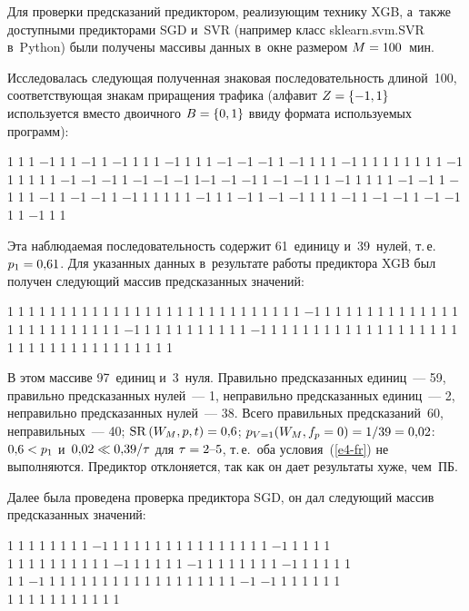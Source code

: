 \begin{multicols}{2}
  Для проверки предсказаний предиктором, реализующим технику XGB, 
а~также доступными предикторами SGD и~SVR 
(например класс sklearn.svm.SVR в~Python) были 
получены массивы данных в~окне размером $M\hm = 100$~мин.
   
  Исследовалась следующая полученная знаковая последовательность 
длиной~100, соответствующая знакам приращения трафика (алфавит $Z\hm = 
\{-1, 1\}$ используется вместо двоичного $B\hm = \{0, 1\}$ ввиду формата 
используемых программ):
  
   1 1 1 $-$1 1 1 $-$1 1 $-$1 1 1 1 $-$1 1 1 1 $-$1 $-$1 $-$1 1 $-$1 1 1 1 $-$1 1 1 1 1 1 1 1 1 $-
$1 1 1 1 1 1 $-$1 $-$1 $-$1 1 $-$1 $-$1 $-$1 1$-$1 $-$1 $-$1 1 $-$1 $-$1 1 1 $-$1 1 1 1 1 $-$1 
$-$1 1 $-$1 1 1 $-$1 1 $-$1 $-$1 1 $-$1 1 1 1 1 1 $-$1 1 1 $-$1 1 $-$1 $-$1 1 1 1 $-$1 1 $-$1 $-
$1 1 $-$1 $-$1 1 1 $-$1 1 1
  
  
\noindent
  Эта наблюдаемая последовательность содержит 61~единицу и~39~нулей, 
т.\,е.\ $p_1\hm = 0{,}61$. Для указанных данных в~результате работы 
предиктора XGB был получен следующий массив предсказанных значений:


  
   1 1 1 1 1 1 1 1 1 1 1 1 1 1 1 1 1 1 1 1 1 1 1 1 1 1 1 1 $-$1 
1 1 1 1 1 1 1 1 1 1 1 1 1 1 1 1 1 1 1 1 1 1 1 1 $-$1 1 1 1 1 1 1 1 1 1 1
$-$1 1 1 1 1 1 1 1 1 1 1 1 1 1 1 1 1 1 1 1 1 1 1 1 1 1 1 1 1 1 1 1 1 1 1

\vspace*{2pt}
 
 \noindent 
  В этом массиве 97~единиц и~3~нуля. Правильно предсказанных единиц~--- 
  59, правильно предсказанных нулей~--- 1, неправильно предсказанных 
единиц~--- 2, неправильно предсказанных нулей~--- 38. Всего правильных 
предсказаний~60, неправильных~--- 40; $\mathrm{SR}\,(W_M, p, t) \hm= 
0{,}6$; $p_{V=1}(W_M, f_p\hm= 0) \hm= 1/39 \hm= 0{,}02$: $0{,}6 \hm< p_1$ 
и~$0{,}02 \hm\ll 0{,}39/\tau$ для $\tau \hm = 2\mbox{--}5$, т.\,е.\ оба
 условия~(\ref{e4-fr}) не выполняются. Предиктор отклоняется, так как он 
дает результаты хуже, чем~ПБ.
  
  Далее была проведена проверка предиктора SGD, он дал следующий 
массив предсказанных значений:

   1   1  1  1   1   1   1   1   $-1$   1  1  1   1  1  1  1  1  1  1  1  1  1  1  1  $-1$  1   1 1 1\\
  1 1 1 1  1  1  1  1  1 1  $-1$ 1  1   1 1  1  $-1$ 
      1  1  1  1  1  1  1  $-1$  1  1  1  1  1\\
       1  1 $-1$  1  1  1  1  1  1  1  1  1  1  1  1  1  1  1  1  1  1  $-1$  $-1$ 1
 1  1 1  1  1\\
   1  1  1  1  1  1  1  1  1  1 1 


\end{multicols}
